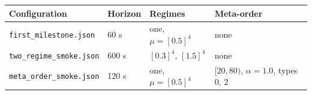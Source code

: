 \begin{tabular}{llll}
  \hline
  Configuration & Horizon & Regimes & Meta-order \\
  \hline
  \texttt{first\_milestone.json} & 60 s & one, $\mu=[0.5]^4$ & none \\
  \texttt{two\_regime\_smoke.json} & 600 s & $[0.3]^4$, $[1.5]^4$ & none \\
  \texttt{meta\_order\_smoke.json} & 120 s & one, $\mu=[0.5]^4$ & $[20,80)$, $\alpha=1.0$, types 0, 2 \\
  \hline
\end{tabular}
